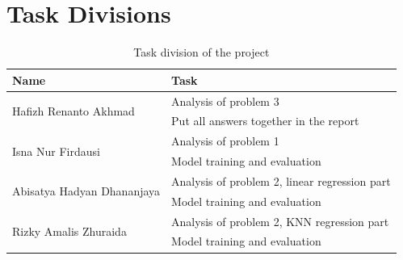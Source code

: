 \documentclass[conf]{new-aiaa}
\begin{document}
\section*{Task Divisions}
\begin{table}[H]
    \centering
    \caption{\label{tab:task_division}Task division of the project}
    \begin{tabular}{ll}
        \toprule
        Name & Task \\
        \midrule
        \multirow{2}{*}{Hafizh Renanto Akhmad} & Analysis of problem 3 \\
        & Put all answers together in the report \\
        \midrule
        \multirow{2}{*}{Isna Nur Firdausi} & Analysis of problem 1 \\
        & Model training and evaluation \\
        \midrule
        \multirow{2}{*}{Abisatya Hadyan Dhananjaya} & Analysis of problem 2, linear regression part \\
        & Model training and evaluation \\
        \midrule
        \multirow{2}{*}{Rizky Amalis Zhuraida} & Analysis of problem 2, KNN regression part \\
        & Model training and evaluation \\
        \bottomrule
    \end{tabular}
\end{table}



\end{document}
